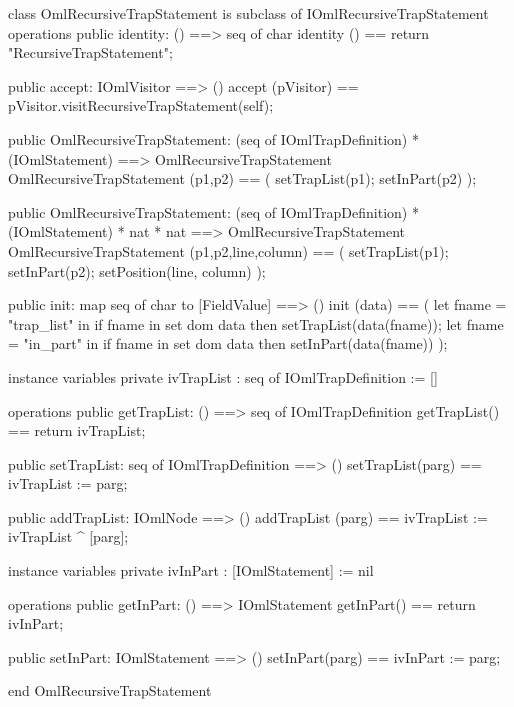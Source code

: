 \begin{vdm_al}
class OmlRecursiveTrapStatement is subclass of IOmlRecursiveTrapStatement
operations
  public identity: () ==> seq of char
  identity () == return "RecursiveTrapStatement";

  public accept: IOmlVisitor ==> ()
  accept (pVisitor) == pVisitor.visitRecursiveTrapStatement(self);

  public OmlRecursiveTrapStatement:
    (seq of IOmlTrapDefinition) *
    (IOmlStatement) ==> OmlRecursiveTrapStatement
  OmlRecursiveTrapStatement (p1,p2) == 
    ( setTrapList(p1);
      setInPart(p2) );

  public OmlRecursiveTrapStatement:
    (seq of IOmlTrapDefinition) *
    (IOmlStatement) *
    nat *
    nat ==> OmlRecursiveTrapStatement
  OmlRecursiveTrapStatement (p1,p2,line,column) == 
    ( setTrapList(p1);
      setInPart(p2);
      setPosition(line, column) );

  public init: map seq of char to [FieldValue] ==> ()
  init (data) ==
    ( let fname = "trap_list" in
        if fname in set dom data
        then setTrapList(data(fname));
      let fname = "in_part" in
        if fname in set dom data
        then setInPart(data(fname)) );

instance variables
  private ivTrapList : seq of IOmlTrapDefinition := []

operations
  public getTrapList: () ==> seq of IOmlTrapDefinition
  getTrapList() == return ivTrapList;

  public setTrapList: seq of IOmlTrapDefinition ==> ()
  setTrapList(parg) == ivTrapList := parg;

  public addTrapList: IOmlNode ==> ()
  addTrapList (parg) == ivTrapList := ivTrapList ^ [parg];

instance variables
  private ivInPart : [IOmlStatement] := nil

operations
  public getInPart: () ==> IOmlStatement
  getInPart() == return ivInPart;

  public setInPart: IOmlStatement ==> ()
  setInPart(parg) == ivInPart := parg;

end OmlRecursiveTrapStatement
\end{vdm_al}


